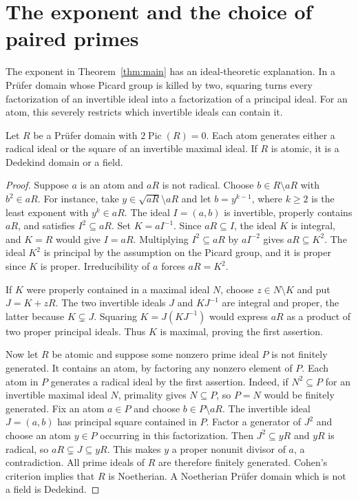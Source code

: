 \section{The exponent and the choice of paired primes}
\label{sec:sharpness}

The exponent in Theorem~\ref{thm:main} has an ideal-theoretic explanation.
In a Pr\"ufer domain whose Picard group is killed by two, squaring turns every factorization of an invertible ideal into a factorization of a principal ideal.
For an atom, this severely restricts which invertible ideals can contain it.

\begin{proposition}
    \label{prop:exponent-two}
    Let $R$ be a Pr\"ufer domain with $2\operatorname{Pic}(R) = 0$.
    Each atom generates either a radical ideal or the square of an invertible maximal ideal.
    If $R$ is atomic, it is a Dedekind domain or a field.
\end{proposition}

\begin{proof}
    Suppose $a$ is an atom and $aR$ is not radical.
    Choose $b \in R \setminus aR$ with $b^2 \in aR$.
    For instance, take $y \in \sqrt{aR} \setminus aR$ and let $b = y^{k - 1}$, where $k \ge 2$ is the least exponent with $y^k \in aR$.
    The ideal $I = (a, b)$ is invertible, properly contains $aR$, and satisfies $I^2 \subseteq aR$.
    Set $K = aI^{-1}$.
    Since $aR \subseteq I$, the ideal $K$ is integral, and $K = R$ would give $I = aR$.
    Multiplying $I^2 \subseteq aR$ by $aI^{-2}$ gives $aR \subseteq K^2$.
    The ideal $K^2$ is principal by the assumption on the Picard group, and it is proper since $K$ is proper.
    Irreducibility of $a$ forces $aR = K^2$.

    If $K$ were properly contained in a maximal ideal $N$, choose $z \in N \setminus K$ and put $J = K + zR$.
    The two invertible ideals $J$ and $KJ^{-1}$ are integral and proper, the latter because $K \subsetneq J$.
    Squaring $K = J(KJ^{-1})$ would express $aR$ as a product of two proper principal ideals.
    Thus $K$ is maximal, proving the first assertion.

    Now let $R$ be atomic and suppose some nonzero prime ideal $P$ is not finitely generated.
    It contains an atom, by factoring any nonzero element of $P$.
    Each atom in $P$ generates a radical ideal by the first assertion.
    Indeed, if $N^2 \subseteq P$ for an invertible maximal ideal $N$, primality gives $N \subseteq P$, so $P = N$ would be finitely generated.
    Fix an atom $a \in P$ and choose $b \in P \setminus aR$.
    The invertible ideal $J = (a, b)$ has principal square contained in $P$.
    Factor a generator of $J^2$ and choose an atom $y \in P$ occurring in this factorization.
    Then $J^2 \subseteq yR$ and $yR$ is radical, so $aR \subsetneq J \subseteq yR$.
    This makes $y$ a proper nonunit divisor of $a$, a contradiction.
    All prime ideals of $R$ are therefore finitely generated.
    Cohen's criterion \cite[Theorem~2]{Cohen} implies that $R$ is Noetherian.
    A Noetherian Pr\"ufer domain which is not a field is Dedekind.
\end{proof}

